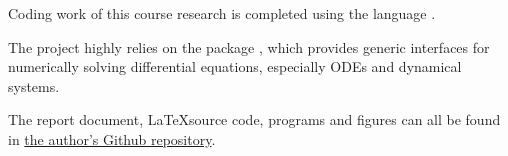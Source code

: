\documentclass[UTF8,a4paper,11pt]{ctexart}
\begin{document}
Coding work of this course research is completed using the  language \cite{julialang}.

The project highly relies on the package  \cite{DifferentialEquations}, which provides generic interfaces for numerically solving differential equations, especially ODEs and dynamical systems.

The report document, \LaTeX source code, programs and figures can all be found in \textcolor{blue}{\href{https://github.com/PDE2718/NaiveSDE.jl}{the author's Github repository}}.

\newpage
\printbibliography















\end{document}
